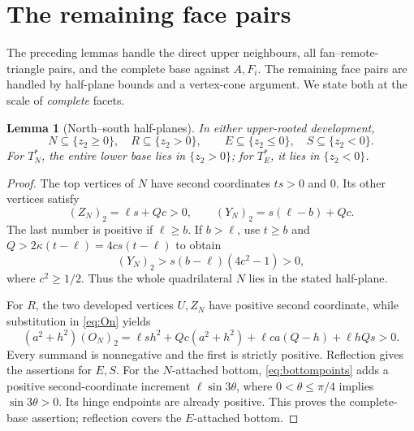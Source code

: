 \documentclass[11pt]{amsart}
\newtheorem{lemma}[theorem]{Lemma}
\begin{document}
\section{The remaining face pairs}
The preceding lemmas handle the direct upper neighbours, all fan--remote-triangle pairs, and the complete base against \(A,F_i\). The remaining face pairs are handled by half-plane bounds and a vertex-cone argument. We state both at the scale of \emph{complete} facets.

\begin{lemma}[North--south half-planes]\label{lem:halfplanes}
In either upper-rooted development,
\[
 N\subseteq\{z_2\ge0\},\quad R\subseteq\{z_2>0\},\qquad
 E\subseteq\{z_2\le0\},\quad S\subseteq\{z_2<0\}.
\]
For \(T_N^*\), the entire lower base lies in \(\{z_2>0\}\); for \(T_E^*\), it lies in \(\{z_2<0\}\).
\end{lemma}
\begin{proof}
The top vertices of \(N\) have second coordinates \(ts>0\) and \(0\). Its other vertices satisfy
\[
 (Z_N)_2=\ell s+Qc>0,\qquad
 (Y_N)_2=s(\ell-b)+Qc.
\]
The last number is positive if \(\ell\ge b\). If \(b>\ell\), use \(t\ge b\) and \(Q>2\kappa(t-\ell)=4cs(t-\ell)\) to obtain
\[
 (Y_N)_2>s(b-\ell)(4c^2-1)>0,
\]
where \(c^2\ge1/2\). Thus the whole quadrilateral \(N\) lies in the stated half-plane.

For \(R\), the two developed vertices \(U,Z_N\) have positive second coordinate, while substitution in \eqref{eq:On} yields
\begin{equation}\label{eq:Oy}
 (a^2+h^2)(O_N)_2
 =\ell s h^2+Qc(a^2+h^2)+\ell ca(Q-h)+\ell hQs>0.
\end{equation}
Every summand is nonnegative and the first is strictly positive. Reflection gives the assertions for \(E,S\). For the \(N\)-attached bottom, \eqref{eq:bottompoints} adds a positive second-coordinate increment \(\ell\sin3\theta\), where \(0<\theta\le\pi/4\) implies \(\sin3\theta>0\). Its hinge endpoints are already positive. This proves the complete-base assertion; reflection covers the \(E\)-attached bottom.
\end{proof}
\end{document}
